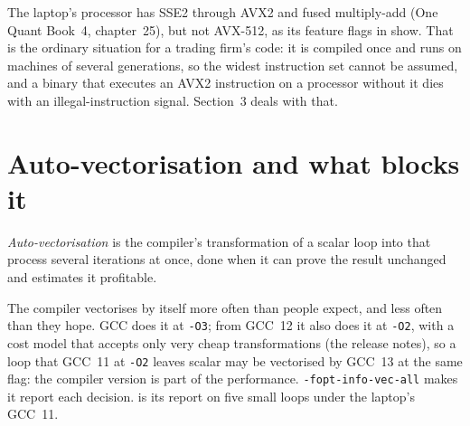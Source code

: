 The laptop's processor has SSE2 through AVX2 and fused multiply-add (One Quant Book~4, chapter~25), but not AVX-512, as its
feature flags in  show. That is the ordinary situation for a trading firm's code: it is compiled once
and runs on machines of several generations, so the widest instruction set cannot be assumed, and a binary that executes an
AVX2 instruction on a processor without it dies with an illegal-instruction signal. Section~3 deals with that.

\section{Auto-vectorisation and what blocks it}

\begin{definition}\label{def:ll:vector-instructions-and-data-parallel-code:auto}
\emph{Auto-vectorisation} is the compiler's transformation of a scalar loop into  that process several iterations at once, done when it can prove the result unchanged and estimates it
profitable.
\end{definition}

The compiler vectorises by itself more often than people expect, and less often than they hope. GCC does it at
\texttt{-O3}; from GCC~12 it also does it at \texttt{-O2}, with a cost model that accepts only very cheap
transformations (the release notes), so a loop that GCC~11 at \texttt{-O2} leaves scalar may be vectorised by GCC~13 at the
same flag: the compiler version is part of the performance. \texttt{-fopt-info-vec-all} makes it report each decision.
 is its report on five small loops under the laptop's GCC~11.

\label{lst:ll:vector-instructions-and-data-parallel-code:report}

